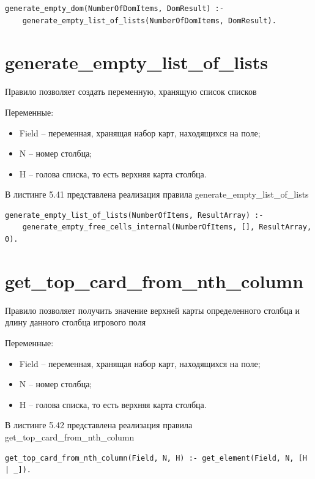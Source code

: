 \documentclass[12pt]{report}
\begin{document}
\begin{lstlisting}[label=some-code, caption=реализация правила generate\_empty\_free\_cells]
generate_empty_dom(NumberOfDomItems, DomResult) :-
	generate_empty_list_of_lists(NumberOfDomItems, DomResult).
\end{lstlisting}

\section{generate\_empty\_list\_of\_lists}
Правило позволяет создать переменную, хранящую список списков

Переменные:
\begin{itemize}
\item Field – переменная, хранящая набор карт, находящихся на поле;
\item N – номер столбца;
\item H – голова списка, то есть верхняя карта столбца.
\end{itemize}

В листинге 5.41 представлена реализация правила
generate\_empty\_list\_of\_lists

\begin{lstlisting}[label=some-code, caption=реализация правила generate\_empty\_list\_of\_lists]
generate_empty_list_of_lists(NumberOfItems, ResultArray) :-
	generate_empty_free_cells_internal(NumberOfItems, [], ResultArray, 0).
\end{lstlisting}
\section{get\_top\_card\_from\_nth\_column}
Правило позволяет получить значение верхней карты определенного столбца и длину данного столбца игрового поля

Переменные:
\begin{itemize}
\item Field – переменная, хранящая набор карт, находящихся на поле;
\item N – номер столбца;
\item H – голова списка, то есть верхняя карта столбца.
\end{itemize}

В листинге 5.42 представлена реализация правила
\newline
get\_top\_card\_from\_nth\_column

\begin{lstlisting}[label=some-code, caption=реализация правила get\_top\_card\_from\_nth\_column]
get_top_card_from_nth_column(Field, N, H) :- get_element(Field, N, [H | _]).
\end{lstlisting}
\end{document}
